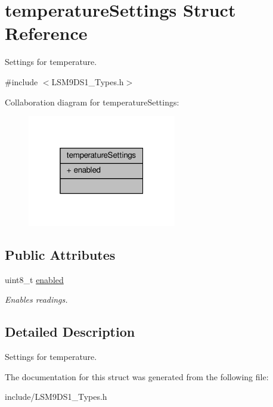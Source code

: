 \hypertarget{structtemperatureSettings}{}\section{temperature\+Settings Struct Reference}
\label{structtemperatureSettings}


Settings for temperature.  




{\ttfamily \#include $<$L\+S\+M9\+D\+S1\+\_\+\+Types.\+h$>$}



Collaboration diagram for temperature\+Settings\+:\nopagebreak
\begin{figure}[H]
\begin{center}
\leavevmode
\includegraphics[width=184pt]{structtemperatureSettings__coll__graph}
\end{center}
\end{figure}
\subsection*{Public Attributes}
\begin{DoxyCompactItemize}
\item 
\mbox{\label{structtemperatureSettings_aeb258e2620d85e2f72fc057dbffa9715}} 
uint8\+\_\+t \hyperlink{structtemperatureSettings_aeb258e2620d85e2f72fc057dbffa9715}{enabled}
\begin{DoxyCompactList}\small\item\em Enables readings. \end{DoxyCompactList}\end{DoxyCompactItemize}


\subsection{Detailed Description}
Settings for temperature. 

The documentation for this struct was generated from the following file\+:\begin{DoxyCompactItemize}
\item 
include/L\+S\+M9\+D\+S1\+\_\+\+Types.\+h\end{DoxyCompactItemize}
